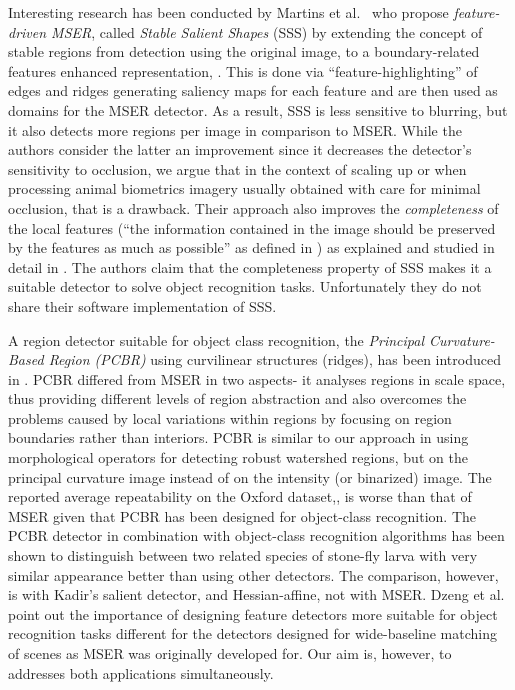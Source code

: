 \documentclass[conference,compsoc]{IEEEtran}
\begin{document}
Interesting research has been conducted by Martins et al.~ who propose {\em feature-driven MSER}, called  {\em Stable Salient Shapes} (SSS) by extending the concept of stable regions from detection using the original image, to a boundary-related features enhanced representation, \cite{MartinsVisapp12, Martins12}. This is done via ``feature-highlighting'' of edges and ridges generating saliency maps for each feature and are then used as domains for the MSER detector. As a result, SSS is less sensitive to blurring, but it also detects more regions per image in comparison to MSER. While the authors consider the latter an improvement since it decreases the detector's sensitivity to occlusion, we argue that in the context of scaling up or when processing animal biometrics imagery usually obtained with care for minimal occlusion, that is a drawback. Their approach also improves the {\em completeness} of the local features (``the information contained in the image should be preserved by the features as much as possible'' as defined in \cite{Dickscheid2011}) as explained and studied in detail in \cite{Martins2016OnTC}. The authors claim that the completeness property of SSS makes it a suitable detector to solve object recognition tasks. Unfortunately they do not share their software implementation of SSS.

A region detector suitable for object class recognition, the {\em Principal Curvature-Based Region (PCBR)} using curvilinear structures (ridges), has been introduced in \cite{DengZMDS07}. PCBR differed from MSER in two aspects- it analyses regions in scale space, thus providing different levels of region abstraction and also overcomes the problems caused by local variations within regions by focusing on region boundaries rather than interiors. PCBR is similar to our approach in using morphological operators for detecting robust watershed regions, but on the principal curvature image instead of on the intensity (or binarized) image. The reported average repeatability on the Oxford dataset,\cite{Mikolajczyk:2005}, is worse than that of MSER given that PCBR has been designed for object-class recognition. The PCBR detector in combination with object-class recognition algorithms has been shown to distinguish between two related species of stone-fly larva with very similar appearance better than using other detectors. The comparison, however, is with Kadir's salient detector, \cite{Kadir2004} and Hessian-affine, not with MSER.  Dzeng et al. point out the importance of designing feature detectors more suitable for object recognition tasks different for the detectors designed for wide-baseline matching of scenes as MSER was originally developed for. Our aim is, however, to addresses both applications simultaneously.
\end{document}
